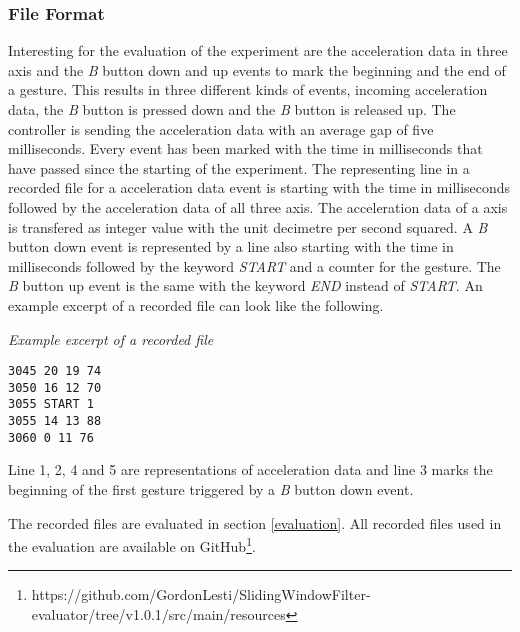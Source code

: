 \subsubsection{File Format} \label{file_format}
Interesting for the evaluation of the experiment are the acceleration data in three axis and the \textit{B} button down
and up events to mark the beginning and the end of a gesture. This results in three different kinds of events, incoming
acceleration data, the \textit{B} button is pressed down and the \textit{B} button is released up. The controller is
sending the acceleration data with an average gap of five milliseconds. Every event has been marked with the time
in milliseconds that have passed since the starting of the experiment. The representing line in a recorded file for a
acceleration data event is starting with the time in milliseconds followed by the acceleration data of all three axis.
The acceleration data of a axis is transfered as integer value with the unit decimetre per second squared. A \textit{B}
button down event is represented by a line also starting with the time in milliseconds followed by the keyword
\textit{START} and a counter for the gesture. The \textit{B} button up event is the same with the keyword \textit{END}
instead of \textit{START}. An example excerpt of a recorded file can look like the following.

\medskip
\noindent
{\it Example excerpt of a recorded file}
\begin{verbatim}
3045 20 19 74
3050 16 12 70
3055 START 1
3055 14 13 88
3060 0 11 76
\end{verbatim}
\noindent
{\small Line 1, 2, 4 and 5 are representations of acceleration data and line 3 marks the beginning of the first gesture
triggered by a \textit{B} button down event.}

\medskip

The recorded files are evaluated in section \ref{evaluation}. All
recorded files used in the evaluation are available on
GitHub\footnote{https://github.com/GordonLesti/SlidingWindowFilter-evaluator/tree/v1.0.1/src/main/resources}.

